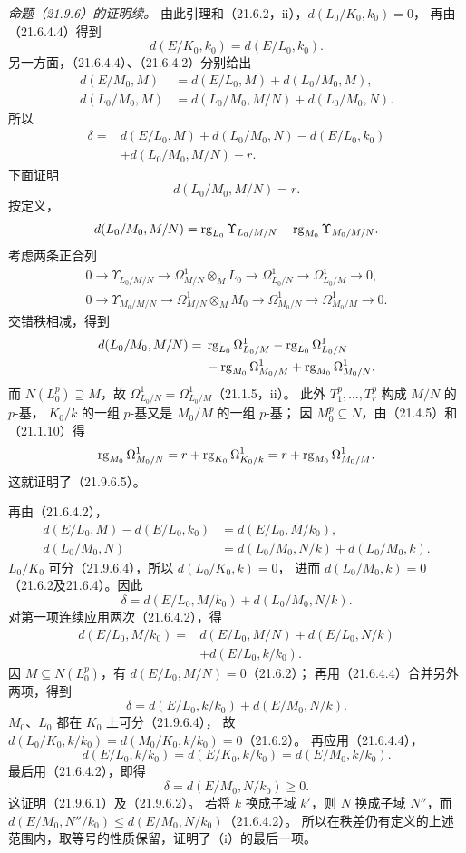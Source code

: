 \noindent\textit{命题（21.9.6）的证明续。}
由此引理和（21.6.2，ii），$d(L_0/K_0,k_0)=0$，
再由（21.6.4.4）得到
\[
 d(E/K_0,k_0)=d(E/L_0,k_0).
\]
另一方面，（21.6.4.4）、（21.6.4.2）分别给出
\begin{align*}
 d(E/M_0,M)&=d(E/L_0,M)+d(L_0/M_0,M),\\
 d(L_0/M_0,M)&=d(L_0/M_0,M/N)+d(L_0/M_0,N).
\end{align*}
所以
\begin{align*}
 \delta={}&d(E/L_0,M)+d(L_0/M_0,N)-d(E/L_0,k_0)\\
          &+d(L_0/M_0,M/N)-r.
\end{align*}
下面证明
\begin{equation}
 d(L_0/M_0,M/N)=r.
 \tag{21.9.6.5}
\end{equation}
按定义，
\[
 d(L_0/M_0,M/N)
 =\operatorname{rg}_{L_0}\Upsilon_{L_0/M/N}-\operatorname{rg}_{M_0}\Upsilon_{M_0/M/N}.
\]
考虑两条正合列
\[
\begin{gathered}
 0\longrightarrow\Upsilon_{L_0/M/N}
 \longrightarrow\Omega^1_{M/N}\otimes_ML_0
 \longrightarrow\Omega^1_{L_0/N}
 \longrightarrow\Omega^1_{L_0/M}\longrightarrow0,\\
 0\longrightarrow\Upsilon_{M_0/M/N}
 \longrightarrow\Omega^1_{M/N}\otimes_MM_0
 \longrightarrow\Omega^1_{M_0/N}
 \longrightarrow\Omega^1_{M_0/M}\longrightarrow0.
\end{gathered}
\]
交错秩相减，得到
\begin{align*}
 d(L_0/M_0,M/N)
 ={}&\operatorname{rg}_{L_0}\Omega^1_{L_0/M}-\operatorname{rg}_{L_0}\Omega^1_{L_0/N}\\
 &-\operatorname{rg}_{M_0}\Omega^1_{M_0/M}+\operatorname{rg}_{M_0}\Omega^1_{M_0/N}.
\end{align*}
而 $N(L_0^p)\supseteq M$，故
$\Omega^1_{L_0/N}=\Omega^1_{L_0/M}$（21.1.5，ii）。
此外 $T_1^p,\ldots,T_r^p$ 构成 $M/N$ 的 $p$-基，
$K_0/k$ 的一组 $p$-基又是 $M_0/M$ 的一组 $p$-基；
因 $M_0^p\subseteq N$，由（21.4.5）和（21.1.10）得
\[
 \operatorname{rg}_{M_0}\Omega^1_{M_0/N}
 =r+\operatorname{rg}_{K_0}\Omega^1_{K_0/k}
 =r+\operatorname{rg}_{M_0}\Omega^1_{M_0/M}.
\]
这就证明了（21.9.6.5）。

再由（21.6.4.2），
\begin{align*}
 d(E/L_0,M)-d(E/L_0,k_0)&=d(E/L_0,M/k_0),\\
 d(L_0/M_0,N)&=d(L_0/M_0,N/k)+d(L_0/M_0,k).
\end{align*}
$L_0/K_0$ 可分（21.9.6.4），所以 $d(L_0/K_0,k)=0$，
进而 $d(L_0/M_0,k)=0$（21.6.2及21.6.4）。因此
\[
 \delta=d(E/L_0,M/k_0)+d(L_0/M_0,N/k).
\]
对第一项连续应用两次（21.6.4.2），得
\begin{align*}
 d(E/L_0,M/k_0)
 ={}&d(E/L_0,M/N)+d(E/L_0,N/k)\\
 &+d(E/L_0,k/k_0).
\end{align*}
因 $M\subseteq N(L_0^p)$，有 $d(E/L_0,M/N)=0$（21.6.2）；
再用（21.6.4.4）合并另外两项，得到
\[
 \delta=d(E/L_0,k/k_0)+d(E/M_0,N/k).
\]
$M_0$、$L_0$ 都在 $K_0$ 上可分（21.9.6.4），
故 $d(L_0/K_0,k/k_0)=d(M_0/K_0,k/k_0)=0$（21.6.2）。
再应用（21.6.4.4），
\[
 d(E/L_0,k/k_0)=d(E/K_0,k/k_0)=d(E/M_0,k/k_0).
\]
最后用（21.6.4.2），即得
\[
 \delta=d(E/M_0,N/k_0)\ge0.
\]
这证明（21.9.6.1）及（21.9.6.2）。
若将 $k$ 换成子域 $k'$，则 $N$ 换成子域 $N''$，而
$d(E/M_0,N''/k_0)\le d(E/M_0,N/k_0)$（21.6.4.2）。
所以在秩差仍有定义的上述范围内，取等号的性质保留，证明了（i）的最后一项。

